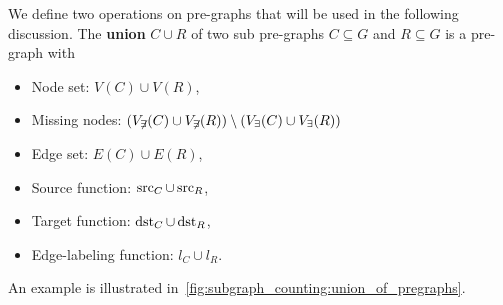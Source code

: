 We define two operations on pre-graphs that will be used in the following discussion.
The \textbf{union} $C \cup R$ of two sub pre-graphs $C \subseteq G$ and $R \subseteq G$ is a pre-graph with 
\begin{itemize}
    \item Node set: $ V(C) \cup V(R) $,
    \item Missing nodes:
        $(
            V_{\not \exists}(C) \cup V_{\not \exists}(R)) \setminus 
            (   V_\exists(C) \cup 
             V_\exists(R)  
                   )$
    \item Edge set: $ E(C) \cup E(R) $, 
    \item Source function: $ \operatorname{src}_C \cup \operatorname{src}_R $,  
    \item Target function: $ \operatorname{dst}_C \cup \operatorname{dst}_R $,  
    \item Edge-labeling function: $ l_C \cup l_R $.   
\end{itemize} 
An example is illustrated in~\autoref{fig:subgraph_counting:union_of_pregraphs}.
